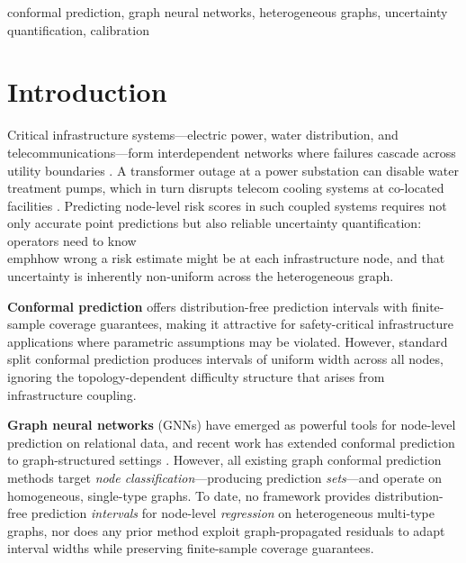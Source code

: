 \documentclass[twoside,11pt]{article}
\begin{document}
\begin{keywords}
conformal prediction, graph neural networks, heterogeneous graphs, uncertainty quantification, calibration
\end{keywords}

\section{Introduction}
\label{sec:intro}

Critical infrastructure systems---electric power, water distribution,
and telecommunications---form interdependent networks where failures
cascade across utility boundaries
\citep{rinaldi2001identifying,buldyrev2010catastrophic}.
A transformer outage at a power substation can disable water treatment
pumps, which in turn disrupts telecom cooling systems at co-located
facilities \citep{ouyang2014review}. Predicting node-level risk scores
in such coupled systems requires not only accurate point predictions
but also reliable uncertainty quantification: operators need to know
\\emph{how wrong} a risk estimate might be at each infrastructure
node, and that uncertainty is inherently non-uniform across the
heterogeneous graph.

\textbf{Conformal prediction} \citep{vovk2005algorithmic,shafer2008tutorial,
angelopoulos2023conformal} offers distribution-free prediction intervals with
finite-sample coverage guarantees, making it attractive for safety-critical
infrastructure applications where parametric assumptions may be violated.
However, standard split conformal prediction produces intervals of uniform
width across all nodes, ignoring the topology-dependent difficulty structure
that arises from infrastructure coupling.

\textbf{Graph neural networks} (GNNs) \citep{kipf2017semi,gilmer2017neural,
hamilton2017inductive} have emerged as powerful tools for node-level prediction
on relational data, and recent work has extended conformal prediction to
graph-structured settings \citep{zargarbashi2023conformal,huang2024uncertainty,
clarkson2023distribution}. However, all existing graph conformal prediction
methods target \emph{node classification}---producing prediction
\emph{sets}---and operate on homogeneous, single-type graphs.
To date, no framework provides distribution-free prediction
\emph{intervals} for node-level \emph{regression} on heterogeneous
multi-type graphs, nor does any prior method exploit graph-propagated
residuals to adapt interval widths while preserving finite-sample coverage
guarantees.
\end{document}

